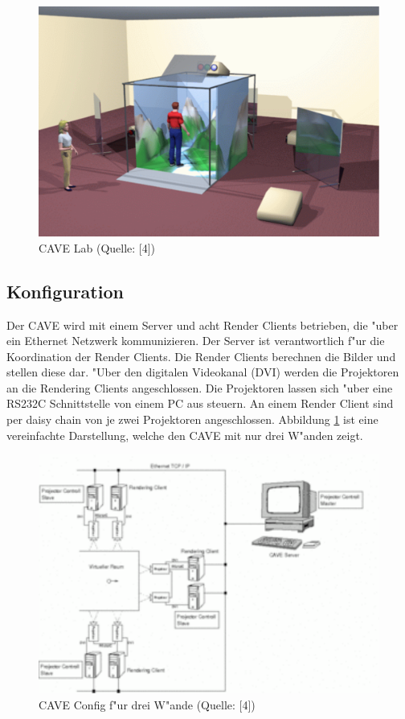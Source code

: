 \begin{figure}[ht]
\begin{center}
\includegraphics[scale=0.4]{../figures/cave_lab}
\end{center}
\caption{CAVE Lab (Quelle: [4])}
\end{figure}

\subsection{Konfiguration}
Der CAVE wird mit einem Server und acht Render Clients betrieben, die "uber ein Ethernet Netzwerk kommunizieren. Der Server ist verantwortlich f"ur die Koordination der Render Clients. Die Render Clients berechnen die Bilder und stellen diese dar. "Uber den digitalen Videokanal (DVI) werden die Projektoren an die Rendering Clients angeschlossen. Die Projektoren lassen sich "uber eine RS232C Schnittstelle von einem PC aus steuern. An einem Render Client sind per daisy chain von je zwei Projektoren angeschlossen. Abbildung \ref{cave_config} ist eine vereinfachte Darstellung, welche den CAVE mit nur drei W"anden zeigt.

\begin{figure}[ht]
\begin{center}
\includegraphics[scale=0.5]{../figures/cave_config}
\end{center}
\caption{CAVE Config f"ur drei W"ande (Quelle: [4])}
\label{cave_config}
\end{figure}

